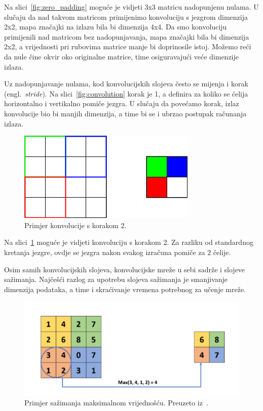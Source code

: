 \documentclass[times, utf8, zavrsni, numeric]{fer}
\begin{document}
Na slici~\ref{fig:zero_padding} moguće je vidjeti 3x3 matricu nadopunjenu nulama. U slučaju da nad takvom matricom primijenimo konvoluciju s jezgrom dimenzija 2x2, mapa značajki na izlazu bila bi dimenzija 4x4.
Da smo konvoluciju primijenili nad matricom bez nadopunjavanja, mapa značajki bila bi dimenzija 2x2, a vrijednosti pri rubovima matrice manje bi doprinosile istoj.
Možemo reći da nule čine okvir oko originalne matrice, time osiguravajući veće dimenzije izlaza.

\pagebreak

Uz nadopunjavanje nulama, kod konvolucijskih slojeva često se mijenja i korak (engl.\ \textit{stride}). 
Na slici~\ref{fig:convolution} korak je 1, a definira za koliko se ćelija horizontalno i vertikalno pomiče jezgra. 
U slučaju da povećamo korak, izlaz konvolucije bio bi manjih dimenzija, a time bi se i ubrzao postupak računanja izlaza.
\begin{figure}[htb]
    \centering
    \includegraphics[scale=0.5]{stride.png}
    \caption{Primjer konvolucije s korakom 2.}
    \label{fig:stride}
\end{figure}

Na slici~\ref{fig:stride} moguće je vidjeti konvoluciju s korakom 2. Za razliku od standardnog kretanja jezgre, ovdje se jezgra nakon svakog izračuna pomiče za 2 ćelije. 

Osim samih konvolucijskih slojeva, konvolucijske mreže u sebi sadrže i slojeve sažimanja. 
Najčešći razlog za upotrebu slojeva sažimanja je smanjivanje dimenzija podataka, a time i skraćivanje vremena potrebnog za učenje mreže.

\begin{figure}[htb]
    \centering
    \includegraphics[scale=0.35]{maxpool.png}
    \caption{Primjer sažimanja maksimalnom vrijednošću. Preuzeto iz~\cite{gholamalinezhad2020pooling}.}
    \label{fig:maxpool}
\end{figure}
\end{document}
